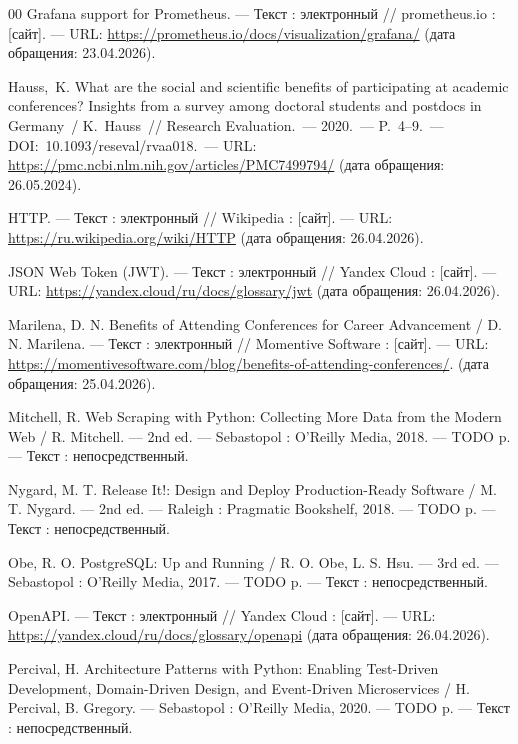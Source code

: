 \begin{thebibliography}{00}
    \hypertarget{grafana_official}{}
    Grafana support for Prometheus. — Текст : электронный // prometheus.io : [сайт]. — URL: \url{https://prometheus.io/docs/visualization/grafana/} (дата обращения: 23.04.2026).

    Hauss,~K. What are the social and scientific benefits of participating at academic conferences? Insights from a survey among doctoral students and postdocs in Germany~/ K.~Hauss~// Research Evaluation.~--- 2020.~--- P.~4--9.~--- DOI:~10.1093/reseval/rvaa018.~--- URL: \url{https://pmc.ncbi.nlm.nih.gov/articles/PMC7499794/} (дата обращения: 26.05.2024).

    HTTP. — Текст : электронный // Wikipedia : [сайт]. — URL: \url{https://ru.wikipedia.org/wiki/HTTP} (дата обращения: 26.04.2026).

    \hypertarget{jwt}{}
    JSON Web Token (JWT). — Текст : электронный // Yandex Cloud : [сайт]. — URL: \url{https://yandex.cloud/ru/docs/glossary/jwt} (дата обращения: 26.04.2026).

    Marilena, D. N. Benefits of Attending Conferences for Career Advancement / D. N. Marilena. — Текст : электронный // Momentive Software : [сайт]. — URL: \url{https://momentivesoftware.com/blog/benefits-of-attending-conferences/}. (дата обращения: 25.04.2026).

    Mitchell, R. Web Scraping with Python: Collecting More Data from the Modern Web / R. Mitchell. — 2nd ed. — Sebastopol : O'Reilly Media, 2018. — TODO p. — Текст : непосредственный.

    Nygard, M. T. Release It!: Design and Deploy Production-Ready Software / M. T. Nygard. — 2nd ed. — Raleigh : Pragmatic Bookshelf, 2018. — TODO p. — Текст : непосредственный.

    Obe, R. O. PostgreSQL: Up and Running / R. O. Obe, L. S. Hsu. — 3rd ed. — Sebastopol : O'Reilly Media, 2017. — TODO p. — Текст : непосредственный.

    OpenAPI. — Текст : электронный // Yandex Cloud : [сайт]. — URL: \url{https://yandex.cloud/ru/docs/glossary/openapi} (дата обращения: 26.04.2026).

    Percival, H. Architecture Patterns with Python: Enabling Test-Driven Development, Domain-Driven Design, and Event-Driven Microservices / H. Percival, B. Gregory. — Sebastopol : O'Reilly Media, 2020. — TODO p. — Текст : непосредственный.


\end{thebibliography}

